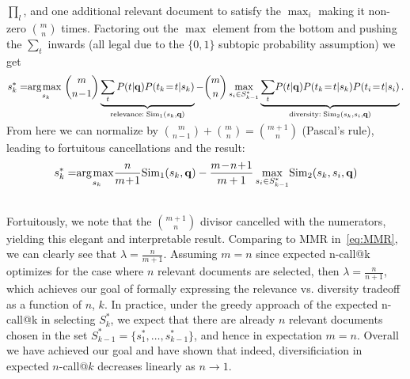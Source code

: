 $\prod_l$, and one additional relevant document to satisfy the
$\max_i$ making it non-zero $\binom{m}{n}$ times.  Factoring out the
$\max$ element from the bottom and pushing the $\sum_t$ inwards (all legal
due to the $\{0,1\}$ subtopic probability assumption) we get
\begin{align}
s_k^* = & \argmax_{s_k} \binom{m}{n\!-\!1} \underbrace{\sum_t P(t|\vec{q}) P(t_k\!=\!t|s_k)}_{\textrm{relevance}: \; \Sim_1(s_k,\vec{q})} - \binom{m}{n} \max_{s_i \in S_{k-1}^*} \underbrace{\sum_t \!P(t|\vec{q}) P(t_k\!=\!t|s_k) P(t_i\!=\!t|s_i)}_{\textrm{diversity}: \; \Sim_2(s_k,s_i,\vec{q})} \nonumber .\\[-7mm] \nonumber
\end{align}  
From here we can 
normalize by $\binom{m}{n-1} + \binom{m}{n} = \binom{m+1}{n}$ 
(Pascal's rule), leading to fortuitous cancellations and the result:
\begin{align}
s_k^* =  & \argmax_{s_k} \!\! \frac{n}{m\!+\!1} \Sim_1(s_k,\vec{q}) - \frac{m\!-\!n\!+\!1}{m+1} \max_{s_i \in S_{k-1}^*} \! \Sim_2(s_k,s_i,\vec{q}) \label{eq:ncall-result} \\ \nonumber
\end{align}
Fortuitously, we note that the $\binom{m+1}{n}$ divisor cancelled with
the numerators, yielding this elegant and interpretable result.
Comparing to MMR in~\eqref{eq:MMR}, we can clearly see that $\lambda =
\frac{n}{m\!+\!1}$.  Assuming $m = n$
since expected n-call@k optimizes for the case where $n$ relevant documents are selected, then $\lambda = \frac{n}{n\!+\!1}$, which achieves our goal of formally expressing the relevance vs. diversity tradeoff as a function of $n$, $k$. In practice, under the greedy approach of the expected n-call@k in selecting $S_k^*$, we expect that there are already $n$ relevant documents chosen in the set $S_{k-1}^* = \{s_1^*, \dots, s_{k-1}^*\}$, and hence in expectation $m=n$.
Overall we have achieved our goal and have shown that
indeed, diversificiation in expected $n$-call@$k$ decreases linearly 
as $n \to 1$.


